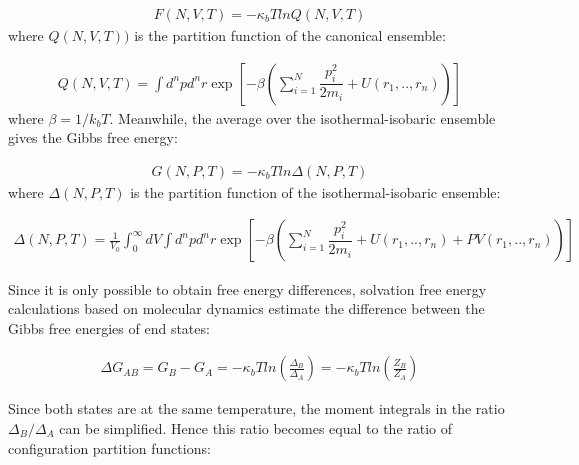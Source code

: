 \begin{equation}
\label{eq:fcano}
\begin{aligned}
F(N,V,T) = -\kappa_{b}T ln Q(N,V,T)
\end{aligned}
\end{equation}
where $Q(N,V,T))$ is the partition function of the canonical ensemble:

\begin{equation}
\label{eq:partican}
\begin{aligned}
Q(N,V,T) = \int d^{n}p d^{n}r \exp \left[ -\beta \left( \sum_{i=1}^{N}\dfrac{p_{i}^{2}}{2m_{i}} + U(r_{1},..,r_{n}) \right)
\right]
\end{aligned}
\end{equation}
where $\beta=1/k_{b}T$. Meanwhile, the average over the isothermal-isobaric ensemble gives the Gibbs free energy:

\begin{equation}
\label{eq:fisobari}
\begin{aligned}
G(N,P,T) = -\kappa_{b}T ln \Delta (N,P,T)
\end{aligned}
\end{equation}
where $\Delta (N,P,T)$ is the partition function of the isothermal-isobaric ensemble:

\begin{equation}
\label{eq:partiso}
\begin{aligned}
\Delta (N,P,T) = \frac{1}{V_{0}} \int_{0}^{\infty} dV \int d^{n}p d^{n}r \exp \left[ -\beta \left( \sum_{i=1}^{N}\dfrac{p_{i}^{2}}{2m_{i}} + U(r_{1},..,r_{n}) + PV(r_{1},..,r_{n}) \right) \right]
\end{aligned}
\end{equation}

Since it is only possible to obtain free energy differences, solvation free energy calculations based on molecular dynamics estimate the difference between the Gibbs free energies of end states:

\begin{equation}
\label{eq:dif}
\begin{aligned}
\Delta G_{AB} = G_{B} - G_{A}= -\kappa_{b}T ln \left( \frac{\Delta_{B}}{\Delta_{A}}\right) = -\kappa_{b}T ln \left( \frac{Z_{B}}{Z_{A}}\right)
\end{aligned}
\end{equation}

Since both states are at the same temperature, the moment integrals in the ratio ${\Delta_{B}}/{\Delta_{A}}$ can be simplified. Hence this ratio becomes equal to the ratio of configuration partition functions:

